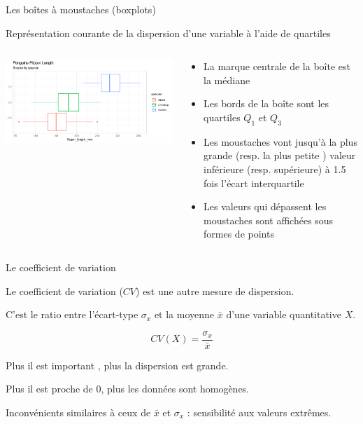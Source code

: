 \documentclass{beamer}
\begin{document}
\begin{frame}{Les boîtes à moustaches (boxplots)}


\vspace{1cm}
Représentation courante de la dispersion d'une variable à l'aide de \alert{quartiles}



\begin{columns}[T,onlytextwidth]

\centering
\includegraphics[width=\linewidth]{img/boxplot.png}

\begin{scriptsize}
\begin{itemize}
\item La \alert{marque centrale} de la boîte est la \alert{médiane}
\item Les \alert{bords} de la boîte sont les \alert{quartiles $Q_1$ et $Q_3$}
\item Les moustaches vont jusqu'à la plus grande (resp. la plus petite ) valeur inférieure (resp. supérieure)  à \alert{1.5 fois l’écart interquartile} 
\item Les valeurs qui dépassent les moustaches sont affichées sous formes de points
\end{itemize}
\end{scriptsize}
\end{columns}

\end{frame}



\begin{frame}{Le coefficient de variation}

Le \alert{coefficient} de variation ($CV$) est une autre mesure de dispersion.

C'est le ratio entre l'écart-type $\sigma_x$ et la moyenne $\bar{x}$ d'une variable quantitative $X$.

$$ CV(X)=\frac{\sigma_x}{\bar{x}}$$

Plus il est important , plus la dispersion est grande.

Plus il est proche de 0, plus les données sont homogènes.


Inconvénients similaires à ceux de  $\bar{x}$ et $\sigma_x$ : sensibilité aux valeurs extrêmes.


\end{frame}
\end{document}
